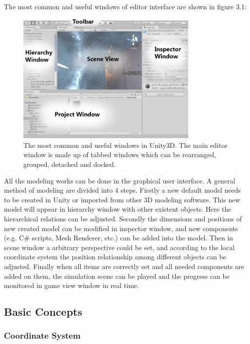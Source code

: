 The most common and useful windows of editor interface are shown in figure 3.1: 

\begin{figure}[h]
	\centering
	\includegraphics[width=0.8\textwidth]{Figures/Section3_Unity_interface}
	\caption{The most common and useful windows in Unity3D. The main editor window is made up of tabbed windows which can be rearranged, grouped, detached and docked. }
	\label{fig: unity interface}
\end{figure}

All the modeling works can be done in the graphical user interface. A general method of modeling are divided into 4 steps. Firstly a new default model needs to be created in Unity or imported from other 3D modeling software. This new model will appear in hierarchy window with other existent objects. Here the hierarchical relations can be adjusted. Secondly the dimensions and positions of new created model can be modified in inspector window, and new components (e.g. C\# scripts, Mesh Renderer, etc.) can be added into the model. Then in scene window a arbitrary perspective could be set, and according to the local coordinate system the position relationship among different objects can be adjusted. Finally when all items are correctly set and all needed components are added on them, the simulation scene can be played and the progress can be monitored in game view window in real time.

\subsection{Basic Concepts}

\subsubsection*{Coordinate System}

